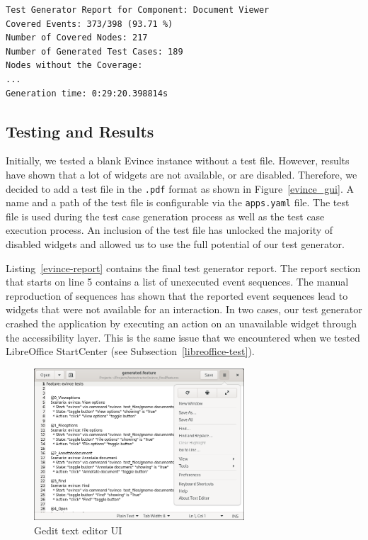 \begin{lstlisting}[caption={Final test generator report for Evince},label={evince-report}, float]
Test Generator Report for Component: Document Viewer
Covered Events: 373/398 (93.71 %)
Number of Covered Nodes: 217
Number of Generated Test Cases: 189
Nodes without the Coverage:
...
Generation time: 0:29:20.398814s
\end{lstlisting}
\subsection*{Testing and Results}
Initially, we tested a blank Evince instance without a test file. However, results have shown that a lot of widgets are not available, or are disabled. Therefore, we decided to add a test file in the \texttt{.pdf} format as shown in Figure~\ref{evince_gui}. A name and a path of the test file is configurable via the \texttt{apps.yaml} file. The test file is used during the test case generation process as well as the test case execution process. An inclusion of the test file has unlocked the majority of disabled widgets and allowed us to use the full potential of our test generator.


Listing~\ref{evince-report} contains the final test generator report. The report section that starts on line 5 contains a list of unexecuted event sequences. The manual reproduction of sequences has shown that the reported event sequences lead to widgets that were not available for an interaction. In two cases, our test generator crashed the application by executing an action on an unavailable widget through the accessibility layer. This is the same issue that we encountered when we tested LibreOffice StartCenter (see Subsection~\ref{libreoffice-test}).

\begin{figure}[hb!]
	\centering
	\includegraphics[width=0.7\textwidth]{obrazky-figures/gedit.png}
	\caption{Gedit text editor UI}
	\label{gedit-ui}
\end{figure}

